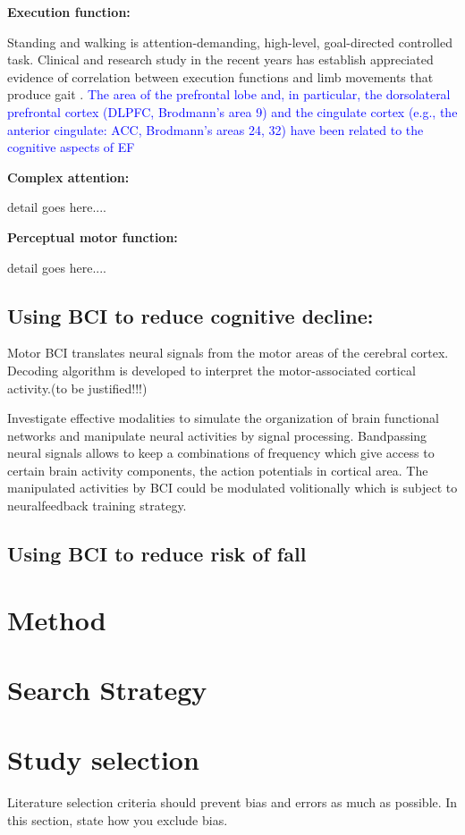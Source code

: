 \documentclass[conference,compsoc]{IEEEtran}
\begin{document}
\textbf{Execution function:}

Standing and walking is attention-demanding, high-level, goal-directed controlled task. Clinical and research study in the recent years has establish appreciated evidence of correlation between execution functions and limb movements that produce gait \cite{Yogev_Seligmann_2007}.
\textcolor{blue}{The area of the prefrontal
lobe and, in particular, the dorsolateral prefrontal cortex
(DLPFC, Brodmann’s area 9) and the cingulate cortex
(e.g., the anterior cingulate: ACC, Brodmann’s areas 24,
32) have been related to the cognitive aspects of EF \cite{Yogev_Seligmann_2007}}

\textbf{Complex attention:}

detail goes here....

\textbf{Perceptual motor function:}

detail goes here....

\subsection{Using BCI to reduce cognitive decline:}

Motor BCI translates neural signals from the motor areas of the cerebral cortex. Decoding algorithm is developed to interpret the motor-associated cortical activity.(to be justified!!!)

Investigate effective modalities to simulate the organization 
of brain functional networks and manipulate neural activities by signal processing. Bandpassing neural signals allows to keep a combinations of frequency which give access to certain brain activity components, the action potentials in cortical area. The manipulated activities by BCI 
could be modulated volitionally which is subject to neuralfeedback training strategy.

\subsection{Using BCI to reduce risk of fall}

\section{Method}
\section{Search Strategy}
\section{Study selection}
Literature selection criteria should prevent bias and errors as much as possible. In this section, state how you exclude bias.
\end{document}
